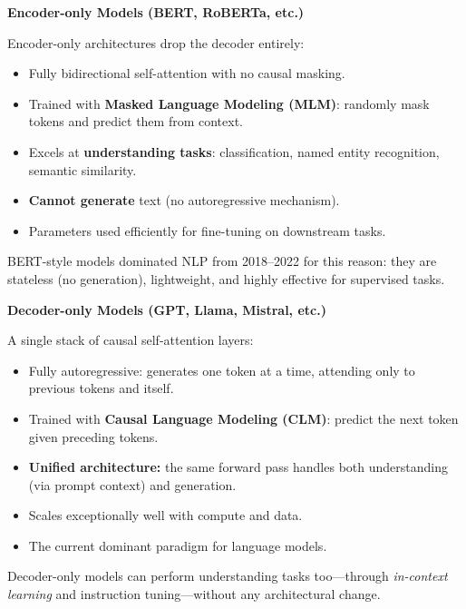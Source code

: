 \begin{notebox}
\textbf{Encoder-only Models (BERT, RoBERTa, etc.)}

Encoder-only architectures drop the decoder entirely:
\begin{itemize}
  \item Fully bidirectional self-attention with no causal masking.
  \item Trained with \textbf{Masked Language Modeling (MLM)}: randomly mask tokens and predict them from context.
  \item Excels at \textbf{understanding tasks}: classification, named entity recognition, semantic similarity.
  \item \textbf{Cannot generate} text (no autoregressive mechanism).
  \item Parameters used efficiently for fine-tuning on downstream tasks.
\end{itemize}
BERT-style models dominated NLP from 2018–2022 for this reason: they are stateless (no generation), lightweight, and highly effective for supervised tasks.
\end{notebox}

\begin{notebox}
\textbf{Decoder-only Models (GPT, Llama, Mistral, etc.)}

A single stack of causal self-attention layers:
\begin{itemize}
  \item Fully autoregressive: generates one token at a time, attending only to previous tokens and itself.
  \item Trained with \textbf{Causal Language Modeling (CLM)}: predict the next token given preceding tokens.
  \item \textbf{Unified architecture:} the same forward pass handles both understanding (via prompt context) and generation.
  \item Scales exceptionally well with compute and data.
  \item The current dominant paradigm for language models.
\end{itemize}
Decoder-only models can perform understanding tasks too—through \textit{in-context learning} and instruction tuning—without any architectural change.
\end{notebox}

